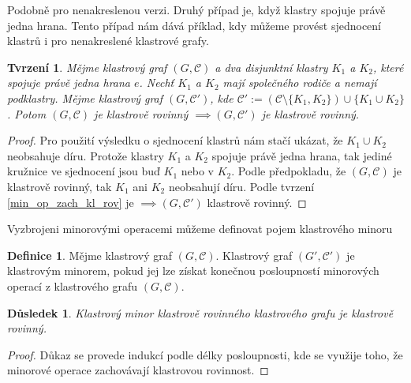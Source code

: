 \documentclass[12pt,a4report]{report}
\newtheorem{tvr}[theorem]{Tvrzení}
\newtheorem{dusl}[theorem]{Důsledek}
\theoremstyle{definition}
\newtheorem{defn}[theorem]{Definice}
\begin{document}
Podobně pro nenakreslenou verzi. Druhý případ je, když klastry spojuje právě jedna hrana. Tento případ nám dává příklad, kdy můžeme provést sjednocení klastrů i pro nenakreslené klastrové grafy.
\begin{tvr}
Mějme klastrový graf  $(G, \mathcal C)$ a dva disjunktní klastry $K_1$ a $K_2$, které spojuje právě jedna hrana $e$. Nechť $K_1$ a $K_2$ mají společného rodiče a nemají podklastry. Mějme klastrový graf $(G, \mathcal C')$, kde  $\mathcal C'  := (\mathcal C \setminus \{K_1,K_2\}) \cup \{K_1 \cup K_2\}$. Potom $(G, \mathcal C)$ je klastrově rovinný $\implies (G, \mathcal C')$ je klastrově rovinný.
\end{tvr}
\begin{proof}
Pro použití výsledku o sjednocení klastrů nám stačí ukázat, že $K_1 \cup K_2$ neobsahuje díru. Protože klastry $K_1$ a $K_2$ spojuje právě jedna hrana, tak jediné kružnice ve sjednocení jsou buď $K_1$ nebo v $K_2$. Podle předpokladu, že $(G, \mathcal C)$ je klastrově rovinný, tak $K_1$ ani $K_2$ neobsahují díru. Podle tvrzení \ref{min_op_zach_kl_rov} je $\implies (G, \mathcal C')$ klastrově rovinný.
\end{proof}

Vyzbrojeni minorovými operacemi můžeme definovat pojem klastrového minoru

\begin{defn}
Mějme klastrový graf $(G,\mathcal C)$. Klastrový graf $(G',\mathcal C')$ je klastrovým minorem, pokud jej lze získat konečnou posloupností minorových operací z klastrového grafu $(G,\mathcal C)$.
\end{defn}

\begin{dusl} Klastrový minor klastrově rovinného klastrového grafu je klastrově rovinný.
\label{důsledek}
\end{dusl}
\begin{proof}
Důkaz se provede indukcí podle délky posloupnosti, kde se využije toho, že minorové operace zachovávají klastrovou rovinnost.
\end{proof}
\end{document}
